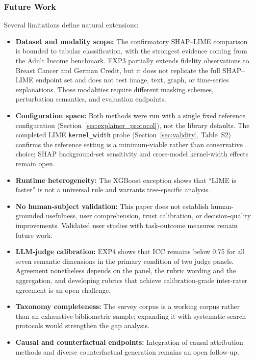 \documentclass[fleqn,10pt,lineno]{wlpeerj}
\begin{document}
\subsubsection{Future Work}

Several limitations define natural extensions:
\begin{itemize}[leftmargin=*]
\item \textbf{Dataset and modality scope:} The confirmatory SHAP--LIME
comparison is bounded to tabular classification, with the strongest
evidence coming from the Adult Income benchmark. EXP3 partially extends
fidelity observations to Breast Cancer and German Credit, but it does not
replicate the full SHAP--LIME endpoint set and does not test image, text,
graph, or time-series explanations. Those modalities require different
masking schemes, perturbation semantics, and evaluation endpoints.
\item \textbf{Configuration space:} Both methods were run with a single
fixed reference configuration (Section~\ref{sec:explainer_protocol}), not
the library defaults. The completed LIME \texttt{kernel\_width} probe
(Section~\ref{sec:validity}, Table~S2) confirms the
reference setting is a minimum-viable rather than conservative choice;
SHAP background-set sensitivity and cross-model kernel-width effects
remain open.
\item \textbf{Runtime heterogeneity:} The XGBoost exception shows that
``LIME is faster'' is not a universal rule and warrants tree-specific analysis.
\item \textbf{No human-subject validation:} This paper does not establish
human-grounded usefulness, user comprehension, trust calibration, or
decision-quality improvements. Validated user studies with task-outcome
measures remain future work.
\item \textbf{LLM-judge calibration:} EXP4 shows that ICC remains below
0.75 for all seven semantic dimensions in the primary condition of two judge
panels. Agreement nonetheless depends on the panel, the rubric wording and the
aggregation, and developing rubrics that achieve calibration-grade inter-rater
agreement is an open challenge.
\item \textbf{Taxonomy completeness:} The survey corpus is a working
corpus rather than an exhaustive bibliometric sample; expanding it with
systematic search protocols would strengthen the gap analysis.
\item \textbf{Causal and counterfactual endpoints:} Integration of
causal attribution methods and diverse counterfactual generation
\citep{mothilal2020dice} remains an open follow-up.
\end{itemize}
\end{document}

